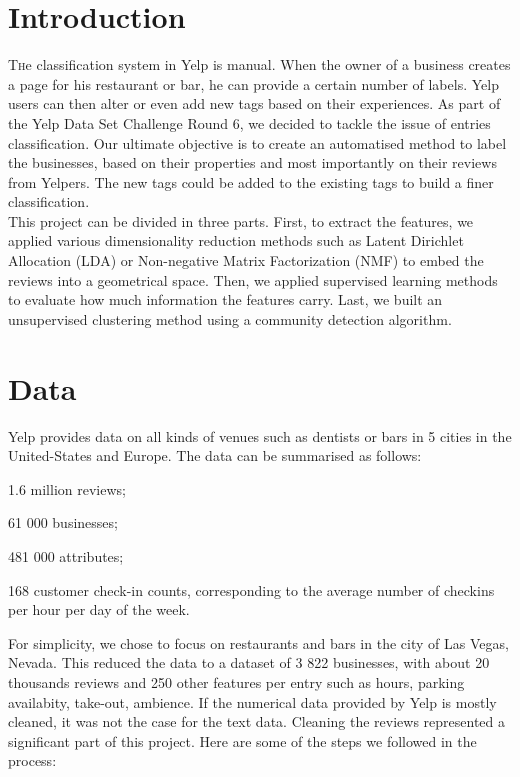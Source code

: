 \documentclass[twoside]{article}
\begin{document}
\begin{multicols}{2} %

\section{Introduction}

\lettrine[nindent=0em,lines=1]{T}he classification system in Yelp is manual. When the owner of a business creates a page for his restaurant or bar, he can provide a certain number of labels. Yelp users can then alter or even add new tags based on their experiences. As part of the Yelp Data Set Challenge Round 6, we decided to tackle the issue of entries classification. Our ultimate objective is to create an automatised method to label the businesses, based on their properties and most importantly on their reviews from Yelpers. The new tags could be added to the existing tags to build a finer classification. \\

This project can be divided in three parts. First, to extract the features, we applied various dimensionality reduction methods such as Latent Dirichlet Allocation (LDA) or Non-negative Matrix Factorization (NMF) to embed the reviews into a geometrical space. Then, we applied supervised learning methods to evaluate how much information the features carry. Last, we built an unsupervised clustering method using a community detection algorithm.

\columnbreak
\section{Data}

Yelp provides data on all kinds of venues such as dentists or bars in 5 cities in the United-States and Europe. The data can be summarised as follows:

\begin{compactitem}
    \item 1.6 million reviews;
    \item 61 000 businesses;    
    \item 481 000 attributes; 
    \item 168 customer check-in counts, corresponding to the average number of checkins per hour per day of the week.
\end{compactitem}

\noindent For simplicity, we chose to focus on restaurants and bars in the city of Las Vegas, Nevada. This reduced the data to a dataset of 3 822 businesses, with about 20 thousands reviews and 250 other features per entry such as hours, parking availabity, take-out, ambience. If the numerical data provided by Yelp is mostly cleaned, it was not the case for the text data. Cleaning the reviews represented a significant part of this project. Here are some of the steps we followed in the process:\\


\end{multicols}
\end{document}
